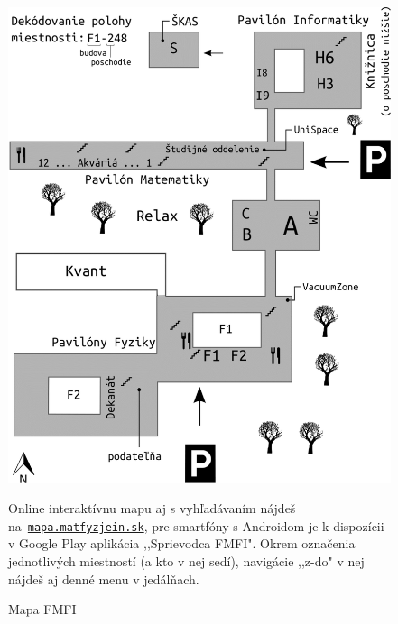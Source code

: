 \begin{figure}[h]
	\begin{centering}
		\vspace{-0.6cm}
		\includegraphics[width=1\textwidth]{obrazky/plan_matfyzu}\label{fig:mapa_fmfi}
		\par\end{centering}
	
	
	\protect\caption{Mapa FMFI}
	Online interaktívnu mapu aj s vyhľadávaním nájdeš na~\href{http://mapa.matfyzjein.sk}{\texttt{mapa.matfyzjein.sk}}, pre smartfóny s Androidom je k dispozícii v Google Play aplikácia ,,Sprievodca FMFI". Okrem označenia jednotlivých miestností (a kto v nej sedí), navigácie ,,z-do" v nej nájdeš aj denné menu v jedálňach.
\end{figure}

